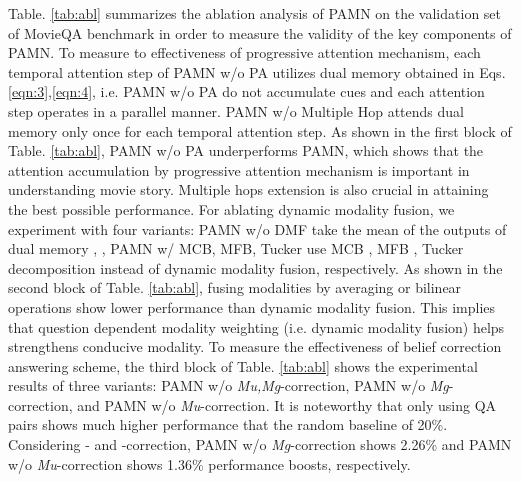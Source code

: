 \documentclass[10pt,twocolumn,letterpaper]{article}
\begin{document}
Table. \ref{tab:abl} summarizes the ablation analysis of PAMN on the validation set of MovieQA benchmark in order to measure the validity of the key components of PAMN. To measure to effectiveness of progressive attention mechanism, 
each temporal attention step of PAMN w/o PA utilizes dual memory obtained in Eqs. \ref{eqn:3},\ref{eqn:4}, i.e. PAMN w/o PA do not accumulate cues and each attention step operates in a parallel manner. PAMN w/o Multiple Hop attends dual memory only once for each temporal attention step. As shown in the first block of Table. \ref{tab:abl}, PAMN w/o PA underperforms PAMN, which shows that the attention accumulation by progressive attention mechanism is important in understanding movie story. Multiple hops extension is also crucial in attaining the best possible performance. For ablating dynamic modality fusion, we experiment with four variants: PAMN w/o DMF take the mean of the outputs of dual memory , , PAMN w/ MCB, MFB, Tucker use MCB \cite{mcb}, MFB \cite{mfb}, Tucker decomposition \cite{mutan,Tucker1966} instead of dynamic modality fusion, respectively. As shown in the second block of Table. \ref{tab:abl}, fusing modalities by averaging or bilinear operations show lower performance than dynamic modality fusion. This implies that question dependent modality weighting (i.e. dynamic modality fusion) helps strengthens conducive modality. To measure the effectiveness of belief correction answering scheme, the third block of Table. \ref{tab:abl} shows the experimental results of three variants: PAMN w/o \textit{Mu,Mg}-correction, PAMN w/o \textit{Mg}-correction, and PAMN w/o \textit{Mu}-correction. It is noteworthy that only using QA pairs shows much higher performance that the random baseline of 20\%. Considering - and -correction, PAMN w/o \textit{Mg}-correction shows 2.26\% and PAMN w/o \textit{Mu}-correction shows 1.36\% performance boosts, respectively.
\end{document}
